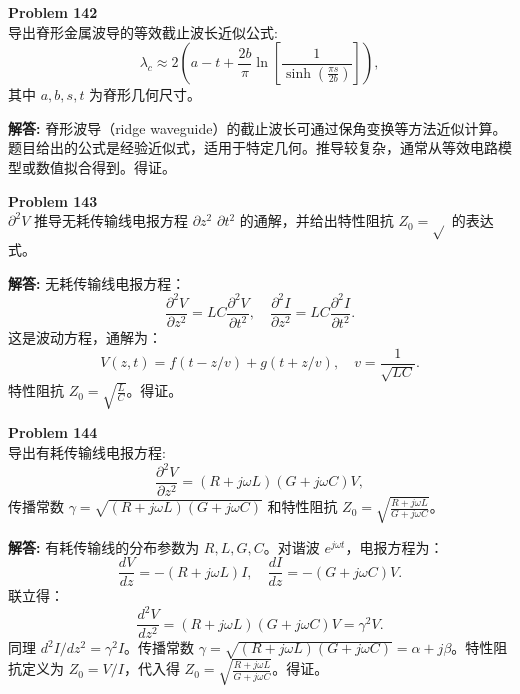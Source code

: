 \documentclass[12pt, a4paper, oneside]{ctexart}
\newenvironment{solution}{\par\noindent\textbf{解答:}\quad}{\par}
\begin{document}
\begin{mdframed}[backgroundcolor=gray!10, linewidth=0pt]
    \textbf{Problem 142} \\
    导出脊形金属波导的等效截止波长近似公式:
    \[
    \lambda_c \approx 2 \left( a - t + \frac{2b}{\pi} \ln \left[ \frac{1}{\sinh \left( \frac{\pi s}{2b} \right)} \right] \right),
    \]
    其中 $a, b, s, t$ 为脊形几何尺寸。
\end{mdframed}
\begin{solution}
    脊形波导（ridge waveguide）的截止波长可通过保角变换等方法近似计算。题目给出的公式是经验近似式，适用于特定几何。推导较复杂，通常从等效电路模型或数值拟合得到。得证。
\end{solution}

\begin{mdframed}[backgroundcolor=gray!10, linewidth=0pt]
    \textbf{Problem 143} \\
    $\partial^2 V$ 推导无耗传输线电报方程 $\partial z^2$ $\partial t^2$ 的通解，并给出特性阻抗 $Z_0 = \sqrt{}$ 的表达式。
\end{mdframed}
\begin{solution}
    无耗传输线电报方程：
    \[
    \frac{\partial^2 V}{\partial z^2} = L C \frac{\partial^2 V}{\partial t^2}, \quad \frac{\partial^2 I}{\partial z^2} = L C \frac{\partial^2 I}{\partial t^2}.
    \]
    这是波动方程，通解为：
    \[
    V(z,t) = f(t - z/v) + g(t + z/v), \quad v = \frac{1}{\sqrt{LC}}.
    \]
    特性阻抗 $Z_0 = \sqrt{\frac{L}{C}}$。得证。
\end{solution}

\begin{mdframed}[backgroundcolor=gray!10, linewidth=0pt]
    \textbf{Problem 144} \\
    导出有耗传输线电报方程:
    \[
    \frac{\partial^2 V}{\partial z^2} = (R + j\omega L)(G + j\omega C) V,
    \]
    传播常数 $\gamma = \sqrt{(R+j\omega L)(G+j\omega C)}$ 和特性阻抗 $Z_0 = \sqrt{\frac{R+j\omega L}{G+j\omega C}}$。
\end{mdframed}
\begin{solution}
    有耗传输线的分布参数为 $R, L, G, C$。对谐波 $e^{j\omega t}$，电报方程为：
    \[
    \frac{dV}{dz} = -(R + j\omega L) I, \quad \frac{dI}{dz} = -(G + j\omega C) V.
    \]
    联立得：
    \[
    \frac{d^2 V}{dz^2} = (R+j\omega L)(G+j\omega C) V = \gamma^2 V.
    \]
    同理 $d^2 I/dz^2 = \gamma^2 I$。传播常数 $\gamma = \sqrt{(R+j\omega L)(G+j\omega C)} = \alpha + j\beta$。特性阻抗定义为 $Z_0 = V/I$，代入得 $Z_0 = \sqrt{\frac{R+j\omega L}{G+j\omega C}}$。得证。
\end{solution}
\end{document}
